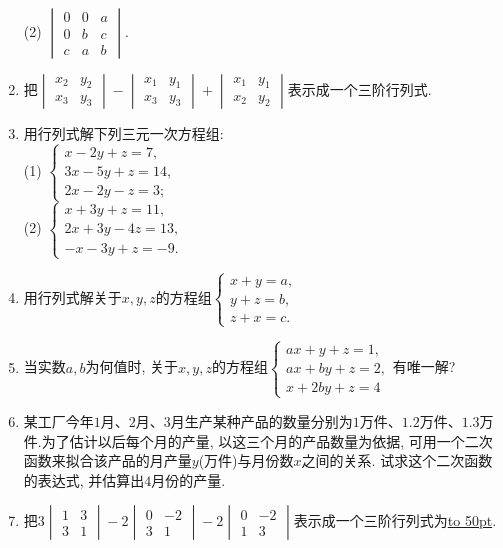 \documentclass[10pt,a4paper]{article}
\newcommand{\blank}[1]{\underline{\hbox to #1pt{}}}
\begin{document}
\begin{enumerate}[1.]
(2) $\begin{vmatrix}    0 & 0 & a  \\0 & b & c  \\c & a & b  \end{vmatrix}$.
\item 把$\begin{vmatrix}    x_2 & y_2  \\x_3 & y_3  \end{vmatrix}-\begin{vmatrix}    x_1 & y_1  \\x_3 & y_3  \end{vmatrix}+\begin{vmatrix}    x_1 & y_1  \\x_2 & y_2  \end{vmatrix}$表示成一个三阶行列式.
\item 用行列式解下列三元一次方程组:\\
(1) $\begin{cases}    x-2y+z=7,  \\3x-5y+z=14,  \\2x-2y-z=3;  \end{cases}$\\
(2) $\begin{cases}    x+3y+z=11,  \\2x+3y-4z=13,  \\-x-3y+z=-9.  \end{cases}$
\item 用行列式解关于$x,y,z$的方程组$\begin{cases}
    x+y=a,  \\y+z=b,  \\z+x=c.  \end{cases}$
\item 当实数$a,b$为何值时, 关于$x,y,z$的方程组$\begin{cases}
ax+y+z=1,  \\ax+by+z=2,  \\x+2by+z=4  \end{cases}$有唯一解?
\item 某工厂今年$1$月、$2$月、$3$月生产某种产品的数量分别为$1$万件、$1.2$万件、$1.3$万件.为了估计以后每个月的产量, 以这三个月的产品数量为依据, 可用一个二次函数来拟合该产品的月产量$y$(万件)与月份数$x$之间的关系. 试求这个二次函数的表达式, 并估算出$4$月份的产量.
\item 把$3\begin{vmatrix}    1 & 3  \\3 & 1  \end{vmatrix}-2\begin{vmatrix}    0 & -2  \\3 & 1  \end{vmatrix}-2\begin{vmatrix}    0 & -2  \\1 & 3  \end{vmatrix}$表示成一个三阶行列式为\blank{50}.

\end{enumerate}
\end{document}
